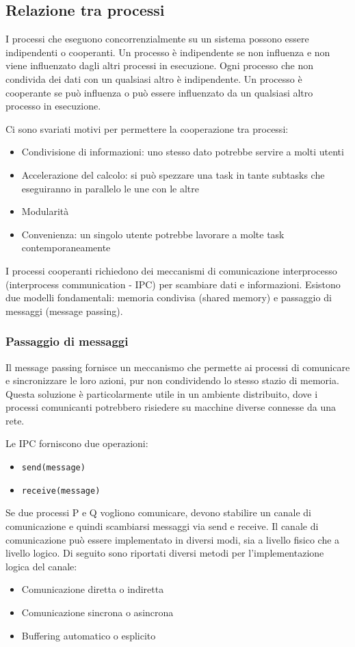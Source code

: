\documentclass[a4paper]{article}
\begin{document}
\subsection{Relazione tra processi}
I processi che eseguono concorrenzialmente su un sistema possono essere indipendenti o cooperanti. Un processo è indipendente se non influenza e non viene influenzato dagli altri processi in esecuzione. Ogni processo che non condivida dei dati con un qualsiasi altro è indipendente. Un processo è cooperante se può influenza o può essere influenzato da un qualsiasi altro processo in esecuzione.

Ci sono svariati motivi per permettere la cooperazione tra processi:
\begin{itemize}
   \item Condivisione di informazioni: uno stesso dato potrebbe servire a molti utenti
   \item Accelerazione del calcolo: si può spezzare una task in tante subtasks che eseguiranno in parallelo le une con le altre
   \item Modularità
   \item Convenienza: un singolo utente potrebbe lavorare a molte task contemporaneamente
\end{itemize}

I processi cooperanti richiedono dei meccanismi di comunicazione interprocesso (interprocess communication - IPC) per scambiare dati e informazioni. Esistono due modelli fondamentali: memoria condivisa (shared memory) e passaggio di messaggi (message passing).

\subsubsection{Passaggio di messaggi}
Il message passing fornisce un meccanismo che permette ai processi di comunicare e sincronizzare le loro azioni, pur non condividendo lo stesso stazio di memoria. Questa soluzione è particolarmente utile in un ambiente distribuito, dove i processi comunicanti potrebbero risiedere su macchine diverse connesse da una rete.

Le IPC forniscono due operazioni:
\begin{itemize}
   \item \texttt{send(message)}
   \item \texttt{receive(message)}
\end{itemize}
Se due processi P e Q vogliono comunicare, devono stabilire un canale di comunicazione e quindi scambiarsi messaggi via send e receive. Il canale di comunicazione può essere implementato in diversi modi, sia a livello fisico che a livello logico. Di seguito sono riportati diversi metodi per l'implementazione logica del canale:
\begin{itemize}
   \item Comunicazione diretta o indiretta
   \item Comunicazione sincrona o asincrona
   \item Buffering automatico o esplicito
\end{itemize}
\end{document}
